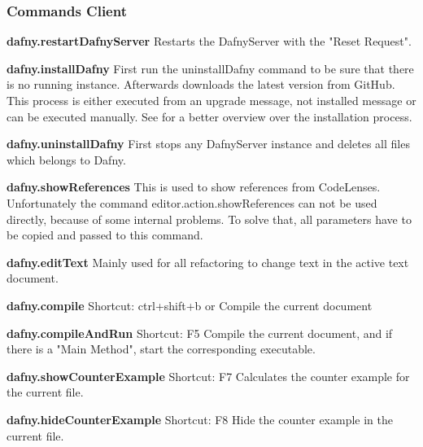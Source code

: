 \subsubsection{Commands Client}

\textbf{dafny.restartDafnyServer}
Restarts the DafnyServer with the "Reset Request".\newline

\textbf{dafny.installDafny}
First run the uninstallDafny command to be sure that there is no running instance. Afterwards downloads the latest version from GitHub. This process is either executed from an upgrade message, not installed message or can be executed manually. 
See  for a better overview over the installation process. \newline

\textbf{dafny.uninstallDafny}
First stops any DafnyServer instance and deletes all files which belongs to Dafny. \newline

\textbf{dafny.showReferences}
This is used to show references from CodeLenses. Unfortunately the command editor.action.showReferences can not be used directly, because of some internal problems. To solve that, all parameters have to be copied and passed to this command. \newline

\textbf{dafny.editText}
Mainly used for all refactoring to change text in the active text document. \newline

\textbf{dafny.compile}
Shortcut: ctrl+shift+b or %
\newline
Compile the current document \newline

\textbf{dafny.compileAndRun}
Shortcut: F5
\newline
Compile the current document, and if there is a "Main Method", start the corresponding executable. \newline

\textbf{dafny.showCounterExample}
Shortcut: F7
\newline
Calculates the counter example for the current file. \newline


\textbf{dafny.hideCounterExample}
Shortcut: F8
\newline
Hide the counter example in the current file.  \newline

